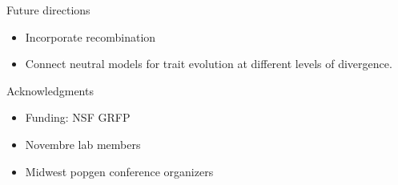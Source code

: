 \documentclass{beamer}
\begin{document}
\begin{frame}{Future directions}
  \begin{itemize}
  \item Incorporate recombination
  \item Connect neutral models for trait evolution at different levels of
    divergence.
  \end{itemize}
\end{frame}

\begin{frame}{Acknowledgments}
  \begin{itemize}
  \item Funding: NSF GRFP
  \item Novembre lab members
  \item Midwest popgen conference organizers
  \end{itemize}
\end{frame}
\end{document}
